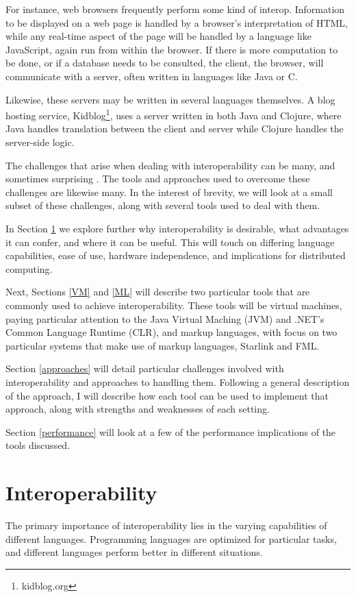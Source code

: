 \documentclass{sig-alternate}
\begin{document}
For instance, web browsers frequently perform some kind of interop. Information to be displayed on a web page is handled by a browser's interpretation of HTML, while any real-time aspect of the page will be handled by a language like JavaScript, again run from within the browser. If there is more computation to be done, or if a database needs to be consulted, the client, the browser, will communicate with a server, often written in languages like Java or C.

Likewise, these servers may be written in several languages themselves. A blog hosting service, Kidblog\footnote{kidblog.org}, uses a server written in both Java and Clojure, where Java handles translation between the client and server while Clojure handles the server-side logic.

The challenges that arise when dealing with interoperability can be many, and sometimes surprising \cite{Chisnall:2013}. The tools and approaches used to overcome these challenges are likewise many. In the interest of brevity, we will look at a small subset of these challenges, along with several tools used to deal with them.

In Section \ref{Interop} we explore further why interoperability is desirable, what advantages it can confer, and where it can be useful. This will touch on differing language capabilities, ease of use, hardware independence, and implications for distributed computing.

Next, Sections \ref{VM} and \ref{ML} will describe two particular tools that are commonly used to achieve interoperability. These tools will be virtual machines, paying particular attention to the Java Virtual Maching (JVM) and .NET's Common Language Runtime (CLR), and markup languages, with focus on two particular systems that make use of markup languages, Starlink and FML.

Section \ref{approaches} will detail particular challenges involved with interoperability and approaches to handling them. Following a general description of the approach, I will describe how each tool can be used to implement that approach, along with strengths and weaknesses of each setting.

Section \ref{performance} will look at a few of the performance implications of the tools discussed.


\section{Interoperability}\label{Interop}
The primary importance of interoperability lies in the varying capabilities of different languages. Programming languages are optimized for particular tasks, and different languages perform better in different situations.
\end{document}
